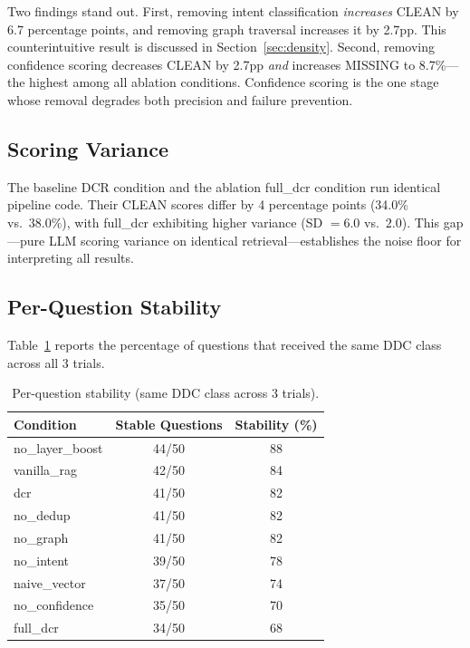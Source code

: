 \documentclass[11pt,a4paper]{article}
\begin{document}
Two findings stand out. First, removing intent classification \emph{increases} CLEAN by 6.7 percentage points, and removing graph traversal increases it by 2.7pp. This counterintuitive result is discussed in Section~\ref{sec:density}. Second, removing confidence scoring decreases CLEAN by 2.7pp \emph{and} increases MISSING to 8.7\%---the highest among all ablation conditions. Confidence scoring is the one stage whose removal degrades both precision and failure prevention.

\subsection{Scoring Variance}

The baseline DCR condition and the ablation full\_dcr condition run identical pipeline code. Their CLEAN scores differ by 4 percentage points (34.0\% vs.\ 38.0\%), with full\_dcr exhibiting higher variance (SD $= 6.0$ vs.\ $2.0$). This gap---pure LLM scoring variance on identical retrieval---establishes the noise floor for interpreting all results.

\subsection{Per-Question Stability}
\label{sec:stability}

Table~\ref{tab:stability} reports the percentage of questions that received the same DDC class across all 3 trials.

\begin{table}[h]
\centering
\caption{Per-question stability (same DDC class across 3 trials).}
\label{tab:stability}
\begin{tabular}{@{}lcc@{}}
\toprule
Condition & Stable Questions & Stability (\%) \\
\midrule
no\_layer\_boost & 44/50 & 88 \\
vanilla\_rag & 42/50 & 84 \\
dcr & 41/50 & 82 \\
no\_dedup & 41/50 & 82 \\
no\_graph & 41/50 & 82 \\
no\_intent & 39/50 & 78 \\
naive\_vector & 37/50 & 74 \\
no\_confidence & 35/50 & 70 \\
full\_dcr & 34/50 & 68 \\
\bottomrule
\end{tabular}
\end{table}
\end{document}
